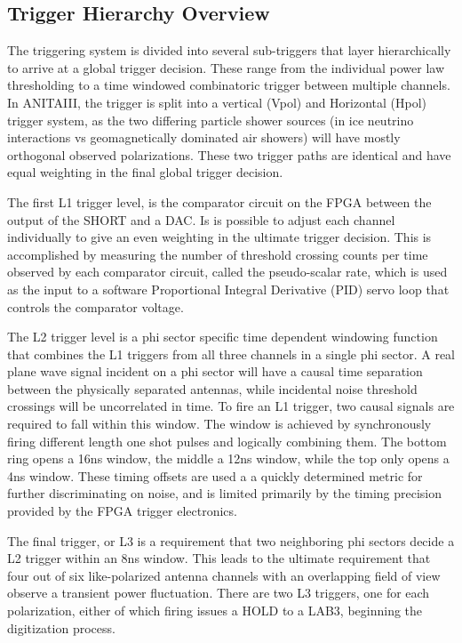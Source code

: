 	
	\subsection{Trigger Hierarchy Overview}
		The triggering system is divided into several sub-triggers that layer hierarchically to arrive at a global trigger decision.   These range from the individual power law thresholding to a time windowed combinatoric trigger between multiple channels.  In ANITAIII, the trigger is split into a vertical (Vpol) and Horizontal (Hpol) trigger system, as the two differing particle shower sources (in ice neutrino interactions vs geomagnetically dominated air showers) will have mostly orthogonal observed polarizations.  These two trigger paths are identical and have equal weighting in the final global trigger decision.  
		
		The first L1 trigger level, is the comparator circuit on the FPGA between the output of the SHORT and a DAC. Is is possible to adjust each channel individually to give an even weighting in the ultimate trigger decision.  This is accomplished by measuring the number of threshold crossing counts per time observed by each comparator circuit, called the pseudo-scalar rate, which is used as the input to a software Proportional Integral Derivative (PID) servo loop that controls the comparator voltage.
		
		The L2 trigger level is a phi sector specific time dependent windowing function that combines the L1 triggers from all three channels in a single phi sector.  A real plane wave signal incident on a phi sector will have a causal time separation between the physically separated antennas, while incidental noise threshold crossings will be uncorrelated in time.  To fire an L1 trigger, two causal signals are required to fall within this window.  The window is achieved by synchronously firing different length one shot pulses and logically combining them.  The bottom ring opens a 16ns window, the middle a 12ns window, while the top only opens a 4ns window. These timing offsets are used a a quickly determined metric for further discriminating on noise, and is limited primarily by the timing precision provided by the FPGA trigger electronics.  
		
		The final trigger, or L3 is a requirement that two neighboring phi sectors decide a L2 trigger within an 8ns window.  This leads to the ultimate requirement that four out of six like-polarized antenna channels with an overlapping field of view observe a transient power fluctuation.  There are two L3 triggers, one for each polarization, either of which firing issues a HOLD to a LAB3, beginning the digitization process.
		

